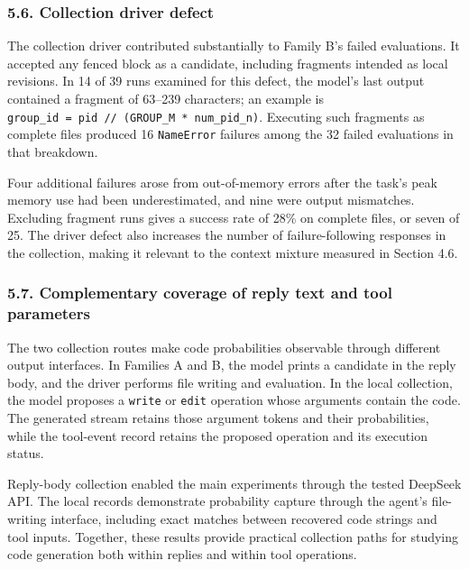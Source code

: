 \documentclass[
  11pt,
]{article}
\begin{document}
\hypertarget{collection-driver-defect}{%
\subsubsection{5.6. Collection driver
defect}\label{collection-driver-defect}}

The collection driver contributed substantially to Family B's failed
evaluations. It accepted any fenced block as a candidate, including
fragments intended as local revisions. In 14 of 39 runs examined for
this defect, the model's last output contained a fragment of 63--239
characters; an example is
\texttt{group\_id\ =\ pid\ //\ (GROUP\_M\ *\ num\_pid\_n)}. Executing
such fragments as complete files produced 16 \texttt{NameError} failures
among the 32 failed evaluations in that breakdown.

Four additional failures arose from out-of-memory errors after the
task's peak memory use had been underestimated, and nine were output
mismatches. Excluding fragment runs gives a success rate of 28\% on
complete files, or seven of 25. The driver defect also increases the
number of failure-following responses in the collection, making it
relevant to the context mixture measured in Section 4.6.

\hypertarget{complementary-coverage-of-reply-text-and-tool-parameters}{%
\subsubsection{5.7. Complementary coverage of reply text and tool
parameters}\label{complementary-coverage-of-reply-text-and-tool-parameters}}

The two collection routes make code probabilities observable through
different output interfaces. In Families A and B, the model prints a
candidate in the reply body, and the driver performs file writing and
evaluation. In the local collection, the model proposes a \texttt{write}
or \texttt{edit} operation whose arguments contain the code. The
generated stream retains those argument tokens and their probabilities,
while the tool-event record retains the proposed operation and its
execution status.

Reply-body collection enabled the main experiments through the tested
DeepSeek API. The local records demonstrate probability capture through
the agent's file-writing interface, including exact matches between
recovered code strings and tool inputs. Together, these results provide
practical collection paths for studying code generation both within
replies and within tool operations.
\end{document}
